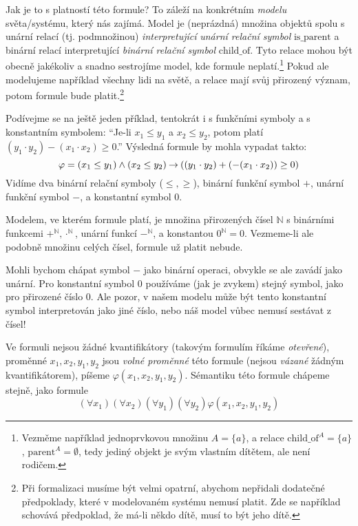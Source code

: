 Jak je to s platností této formule? To záleží na konkrétním \emph{modelu} světa/systému, který nás zajímá. Model je (neprázdná) množina objektů spolu s unární relací (tj. podmnožinou) \emph{interpretující} \emph{unární relační symbol} $\mathrm{is\_parent}$ a binární relací interpretující \emph{binární relační symbol} $\mathrm{child\_of}$. Tyto relace mohou být obecně jakékoliv a snadno sestrojíme model, kde formule neplatí.\footnote{Vezměme například jednoprvkovou množinu $A=\{a\}$, a relace $\mathrm{child\_of}^A=\{a\}$, $\mathrm{parent}^A=\emptyset$, tedy jediný objekt je svým vlastním dítětem, ale není rodičem.} Pokud ale modelujeme například všechny lidi na světě, a relace mají svůj přirozený význam, potom formule bude platit.\footnote{Při formalizaci musíme být velmi opatrní, abychom nepřidali dodatečné předpoklady, které v modelovaném systému nemusí platit. Zde se například schovává předpoklad, že má-li někdo dítě, musí to být jeho dítě.}

Podívejme se na ještě jeden příklad, tentokrát i s funkčními symboly a s konstantním symbolem: ``Je-li $x_1\leq y_1$ a $x_2\leq y_2$, potom platí $(y_1 \cdot y_2)-(x_1\cdot x_2)\geq 0$.'' Výsledná formule by mohla vypadat takto:
$$
\varphi=(x_1\leq y_1)\land (x_2\leq y_2)\mathbin{\rightarrow} ((y_1 \cdot y_2)+(-(x_1\cdot x_2))\geq 0)
$$
Vidíme dva binární relační symboly ($\leq,\geq$), binární funkční symbol $+$, unární funkční symbol $-$, a konstantní symbol $0$. 

Modelem, ve kterém formule platí, je množina přirozených čísel $\mathbb N$ s binárními funkcemi $+^\mathbb N,\cdot^\mathbb N$, unární funkcí $-^\mathbb N$, a konstantou $0^\mathbb N=0$. Vezmeme-li ale podobně množinu celých čísel, formule už platit nebude.

\begin{remark}
Mohli bychom chápat symbol $-$ jako binární operaci, obvykle se ale zavádí jako unární. Pro konstantní symbol $0$ používáme (jak je zvykem) stejný symbol, jako pro přirozené číslo 0. Ale pozor, v našem modelu může být tento konstantní symbol interpretován jako jiné číslo, nebo náš model vůbec nemusí sestávat z čísel!
\end{remark}

Ve formuli nejsou žádné kvantifikátory (takovým formulím říkáme \emph{otevřené}), proměnné $x_1,x_2,y_1,y_2$ jsou \emph{volné proměnné} této formule (nejsou \emph{vázané} žádným kvantifikátorem), píšeme $\varphi(x_1,x_2,y_1,y_2)$. Sémantiku této formule chápeme stejně, jako formule
$$
(\forall x_1)(\forall x_2)(\forall y_1)(\forall y_2)\varphi(x_1,x_2,y_1,y_2)
$$

